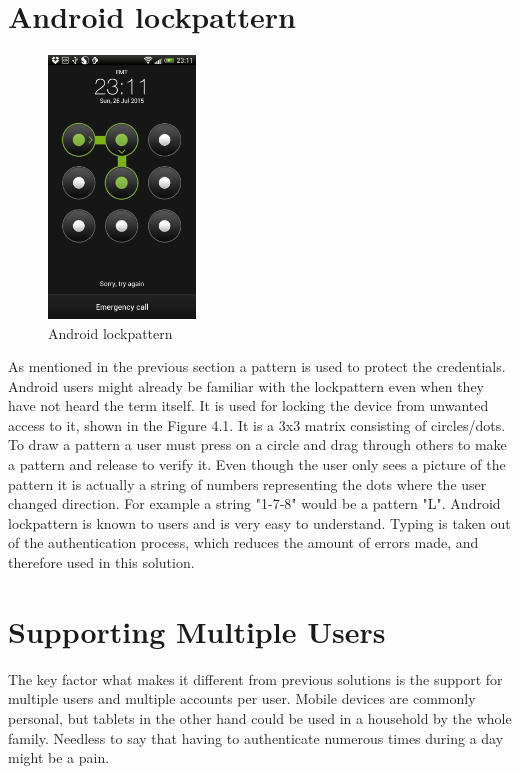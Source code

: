 \section{Android lockpattern}
\begin{figure} 
\begin{center} 
\includegraphics[width=0.35\textwidth]{images/lockpattern.png} \caption{Android lockpattern} \label{fig:android lockpattern} 
\end{center}
\end{figure}
As mentioned in the previous section a pattern is used to protect the credentials. Android users might already be familiar with the lockpattern even when they have not heard the term itself. It is used for locking the device from unwanted access to it, shown in the Figure 4.1. It is a 3x3 matrix consisting of circles/dots. To draw a pattern a user must press on a circle and drag through others to make a pattern and release to verify it. Even though the user only sees a picture of the pattern it is actually a string of numbers representing the dots where the user changed direction. For example a string "1-7-8" would be a pattern "L". 
Android lockpattern is known to users and is very easy to understand. Typing is taken out of the authentication process, which reduces the amount of errors made, and therefore used in this solution.

\section{Supporting Multiple Users}
The key factor what makes it different from previous solutions is the support for multiple users and multiple accounts per user. Mobile devices are commonly personal, but tablets in the other hand could be used in a household by the whole family. Needless to say that having to authenticate numerous times during a day might be a pain. 

